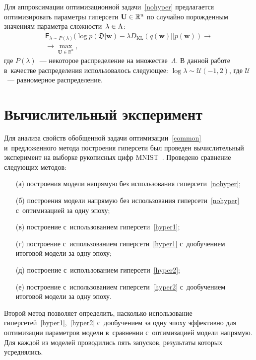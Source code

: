 \begin{multicols}{2}
Для аппроксимации оптимизационной задачи~\eqref{nohyper} предлагается 
оптимизировать параметры гиперсети $\mathbf{U} \hm\in \mathbb{R}^u$ по случайно 
порожденным значениям параметра сложности~$\lambda \hm\in \Lambda$:
\begin{multline}
\label{common}
\mathsf{E}_{\lambda \sim P(\lambda)}
(\log p(\mathfrak{D}| \mathbf{w})
- \lambda D_{\mathrm{KL}}\left(q(\mathbf{w})||p(\mathbf{w})\right)
\to{}\\
{}\to \max\limits_{\mathbf{U} \in \mathbb{R}^u},
\end{multline}
где $P(\lambda)$~--- некоторое распределение на множестве~$\Lambda$. В данной 
работе в~качестве распределения использовалось следующее: $\log \lambda \sim 
\mathcal{U}(-1, 2)$, где $\mathcal{U}$~--- равномерное распределение.

\section{Вычислительный эксперимент}

Для анализа свойств обобщенной задачи оптимизации~\eqref{common} и~предложенного 
метода построения гиперсети был
проведен вычислительный эксперимент на выборке рукописных цифр
MNIST~\cite{lecun-mnisthandwrittendigit-2010}.
Проведено сравнение следующих методов:
\begin{enumerate}
    \item[(а)]  построения модели напрямую без использования 
гиперсети~\eqref{nohyper};
    \item[(б)]  построения модели напрямую без использования 
гиперсети~\eqref{nohyper} с~оптимизацией за одну эпоху;
    \item[(в)]   построение с~использованием гиперсети~\eqref{hyper1};
    \item[(г)]   построение с~использованием гиперсети~\eqref{hyper1} 
    с~дообучением итоговой модели за одну \mbox{эпоху};
    \item[(д)]  построение с~использованием гиперсети~\eqref{hyper2};
    \item[(е)]  построение с~использованием гиперсети~\eqref{hyper2} 
    с~дообучением итоговой модели за одну \mbox{эпоху}.
\end{enumerate}

Второй метод позволяет определить, насколько использование 
гиперсетей~\eqref{hyper1},~\eqref{hyper2} с~дообучением за одну эпоху эффективно 
для оптимизации па\-ра\-мет\-ров модели в~сравнении с~оптимизацией модели напрямую. 
Для каждой из моделей проводились пять запусков, результаты которых усреднялись.


\end{multicols}
